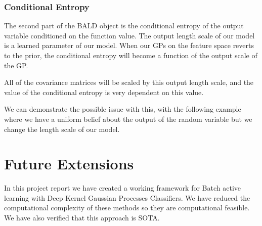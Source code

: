 \documentclass[12pt, a4paper]{report}
\theoremstyle{definition}
\theoremstyle{definition}
\theoremstyle{definition}
\begin{document}
\subsubsection{Conditional Entropy}

The second part of the BALD object is the conditional entropy of the output variable conditioned on the function value. The output length scale of our model is a learned parameter of our model. When our GPs on the feature space reverts to the prior, the conditional entropy will become a function of the output scale of the GP.

All of the covariance matrices will be scaled by this output length scale, and the value of the conditional entropy is very dependent on this value.

We can demonstrate the possible issue with this, with the following example where we have a uniform belief about the output of the random variable but we change the length scale of our model.



\section{Future Extensions}

In this project report we have created a working framework for Batch active learning with Deep Kernel Gaussian Processes Classifiers. We have reduced the computational complexity of these methods so they are computational feasible. We have also verified that this approach is SOTA.





\renewcommand{\bibname}{Bibliography}


\end{document}
